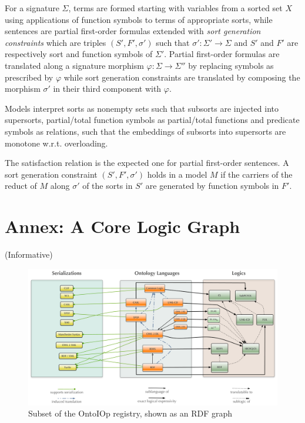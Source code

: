 \documentclass[10pt,fleqn,final]{scrreprt}
\newcommand{\informative}[0]{{\begin{center}{\Large{(Informative})}\end{center}} \bigskip}
\newcommand{\infannex}[1]{ \chapter{Annex: #1}  \informative }
\newenvironment{definitions}[0]{\medskip }{}
\begin{document}
\begin{definitions}
For a signature $\Sigma$, terms are formed starting with
variables from a sorted set $X$ using 
applications of function symbols to terms of appropriate sorts, while
sentences are partial first-order formulas extended with
\emph{sort generation constraints} which are triples $(S', F', \sigma')$ such that 
$\sigma':\Sigma'\rightarrow\Sigma$ and $S'$ and $F'$ are respectively sort and function symbols of
$\Sigma'$. 
Partial first-order formulas are translated along a signature morphism 
$\varphi:\Sigma\rightarrow\Sigma''$ by replacing symbols as prescribed by $\varphi$
while sort generation constraints are translated by
composing the morphism $\sigma'$ in their third component with $\varphi$.

Models interpret sorts as nonempty sets such that subsorts are injected into supersorts,
partial/total function symbols as partial/total functions and 
predicate symbols as relations,
 such that the embeddings of subsorts into
supersorts are monotone w.r.t. overloading.

The satisfaction relation is the expected one for partial first-order sentences. A sort generation
constraint $(S', F', \sigma')$ holds in a model $M$ if the carriers of the reduct of $M$ along $\sigma'$ 
of the sorts in $S'$ are generated by function symbols in $F'$.

\infannex{A Core Logic Graph}\label{a:graph}


\begin{figure}
\centering
   \includegraphics[width=\textwidth]{illustrations/DOL-ontograph-layers-OMG} 
  \caption{Subset of the OntoIOp registry, shown as an RDF graph}
\label{f:DOL-threelayers}
\end{figure}



\end{definitions}
\end{document}

